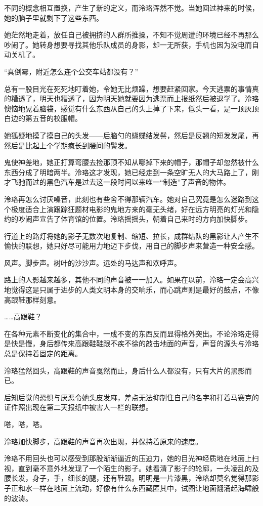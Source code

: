 \documentclass[UTF8, scheme = chinese, openany]{ctexbook}
\begin{document}
不同的概念相互置换，产生了新的定义，而泠珞浑然不觉。当她回过神来的时候，她的脑子里就剩下了这些东西。

她茫然地走着，放任自己被拥挤的人群所推搡，不知不觉周遭的环境已经不再那么吵闹了。她转身想要寻找其他乐队成员的身影，却一无所获，手机也因为没电而自动关机了。

“真倒霉，附近怎么连个公交车站都没有？”

总有一股目光在死死地盯着她，令她无比烦躁，想要赶紧回家。今天逃票的事情真的糟透了，明天也糟透了，因为明天她就要因为逃票而上报纸然后被退学了。泠珞懊恼地晃着脑袋，感觉有什么东西从自己的头上掉了下来，低头一看，是一顶灰顶白边的第五音的校服帽。

她狐疑地摸了摸自己的头发——后脑勺的蝴蝶结发髻，然后是反翘的短发发尾，再然后是比起上个学期疯长到腰间的鬓发。

鬼使神差地，她正打算弯腰去捡那顶不知从哪掉下来的帽子，那帽子却忽然被什么东西分成了明暗两半。泠珞这才发现，她已经走到一条空旷无人的大马路上了，刚才飞驰而过的黑色汽车是过去这一段时间以来唯一“制造”了声音的物体。

泠珞再怎么讨厌噪音，此刻也有些舍不得那辆汽车。她对自己究竟是怎么迷路到这个极度适合上演跟踪狂题材电影的鬼地方来的毫无头绪，好在远方明亮的灯光和隐约的吵闹声宣告了体育馆的位置。泠珞摇摇头，朝着自己来时的方向加快脚步。

行道上的路灯将她的影子无数次地复制、缩短、拉长，成群结队的黑影让人产生不愉快的联想，她只好尽可能用力地迈下步伐，用自己的脚步声来营造一种安全感。

风声。脚步声。树叶的沙沙声。远处的马达声和欢呼声。

路上的人影越来越多，其他不同的声音被一一加入。如果在以前，泠珞一定会高兴地觉得这是只属于进步的人类文明本身的交响乐，而心跳声则是最好的鼓点，不像高跟鞋那样刻意。

……高跟鞋？

在各种元素不断变化的集合中，一成不变的东西反而显得格外突出。不论泠珞走得是快是慢，身后都传来高跟鞋鞋跟不疾不徐的敲击地面的声音，声音的源头与泠珞总是保持着固定的距离。

泠珞猛然回头，高跟鞋的声音戛然而止，身后什么人都没有，只有大片的黑影而已。

后知后觉的恐惧与厌恶令她头皮发麻，差点无法抑制住自己的名字和打着马赛克的证件照出现在第二天报纸中被害人一栏的联想。

嗒，嗒，嗒。

泠珞加快脚步，高跟鞋的声音再次出现，并保持着原来的速度。

泠珞不用回头也可以感受到那股渐渐逼近的压迫力，她的目光神经质地在地面上扫视，直到毫不意外地发现了一个陌生的影子。她看清了影子的轮廓，一头凌乱的及腰长发，身子，手，细长的腿，还有鞋跟。明明是一片漆黑，泠珞却莫名觉得那影子正和水一样在地面上流动，好像有什么东西藏匿其中，试图让地面翻涌起海啸般的波涛。
\end{document}
